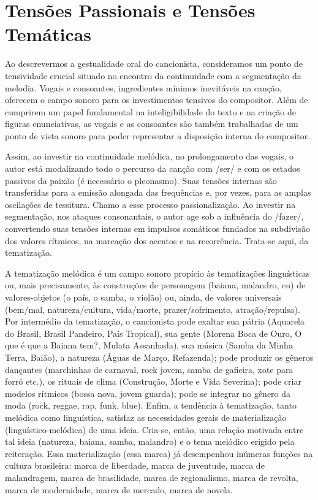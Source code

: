\section{Tensões Passionais e Tensões Temáticas}

Ao descrevermos a gestualidade oral do cancionista, consideramos um
ponto de tensividade crucial situado no encontro da continuidade com a
segmentação da melodia. Vogais e consoantes, ingredientes mínimos
inevitáveis na canção, oferecem o campo sonoro para os investimentos
tensivos do compositor. Além de cumprirem um papel fundamental na
inteligibilidade do texto e na criação de figuras enunciativas, as
vogais e as consoantes são também trabalhadas de um ponto de vista
sonoro para poder representar a disposição interna do compositor.

Assim, ao investir na continuidade melódica, no prolongamento das
vogais, o autor está modalizando todo o percurso da canção com /ser/ e
com os estados passivos da paixão (é necessário o pleonasmo). Suas
tensões internas são transferidas para a emissão alongada das
frequências e, por vezes, para as amplas oscilações de tessitura. Chamo
a esse processo passionalização. Ao investir na segmentação, nos ataques
consonantais, o autor age sob a influência do /fazer/, convertendo suas
tensões internas em impulsos somáticos fundados na subdivisão dos
valores rítmicos, na marcação dos acentos e na recorrência. Trata-se
aqui, da tematização.

A tematização melódica é um campo sonoro propício às tematizações
linguísticas ou, mais precisamente, às construções de personagem
(baiana, malandro, eu) de valores-objetos (o país, o samba, o violão)
ou, ainda, de valores universais (bem/mal, natureza/cultura, vida/morte,
prazer/sofrimento, atração/repulsa). Por intermédio da tematização, o
cancionista pode exaltar sua pátria (Aquarela do Brasil, Brasil
Pandeiro, País Tropical), sua gente (Morena Boca de Ouro, O que é que a
Baiana tem?, Mulata Assanhada), sua música (Samba da Minha Terra,
Baião), a natureza (Águas de Março, Refazenda); pode produzir os gêneros
dançantes (marchinhas de carnaval, rock jovem, samba de gafieira, xote
para forró etc.), os rituais de clima (Construção, Morte e Vida
Severina); pode criar modelos rítmicos (bossa nova, jovem guarda); pode
se integrar no gênero da moda (rock, reggae, rap, funk, blue). Enfim, a
tendência à tematização, tanto melódica como linguística, satisfaz as
necessidades gerais de materialização (linguístico-melódica) de uma
ideia. Cria-se, então, uma relação motivada entre tal ideia (natureza,
baiana, samba, malandro) e o tema melódico erigido pela reiteração. Essa
materialização (essa marca) já desempenhou inúmeras funções na cultura
brasileira: marca de liberdade, marca de juventude, marca de
malandragem, marca de brasilidade, marca de regionalismo, marca de
revolta, marca de modernidade, marca de mercado, marca de novela.~

